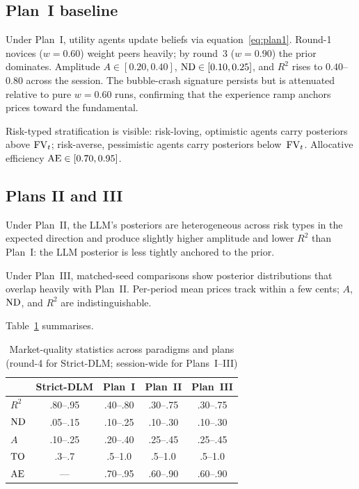 \subsection{Plan~I baseline}

Under Plan~I, utility agents update beliefs via
equation~\eqref{eq:plan1}.  Round-1 novices ($w{=}0.60$) weight peers
heavily; by round~3 ($w{=}0.90$) the prior dominates.  Amplitude
$A\in[0.20,0.40]$, $\mathrm{ND}\in[0.10,0.25]$, and $R^2$ rises to
$0.40$--$0.80$ across the session.  The bubble-crash signature
persists but is attenuated relative to pure $w{=}0.60$ runs,
confirming that the experience ramp anchors prices toward the
fundamental.

Risk-typed stratification is visible: risk-loving, optimistic agents
carry posteriors above $\mathrm{FV}_t$; risk-averse, pessimistic agents carry
posteriors below~$\mathrm{FV}_t$.  Allocative efficiency
$\mathrm{AE}\in[0.70,0.95]$.

\subsection{Plans II and III}

Under Plan~II, the LLM's posteriors are heterogeneous across risk
types in the expected direction and produce slightly higher amplitude
and lower $R^2$ than Plan~I: the LLM posterior is less tightly
anchored to the prior.

Under Plan~III, matched-seed comparisons show posterior distributions
that overlap heavily with Plan~II.  Per-period mean prices track
within a few cents; $A$, $\mathrm{ND}$, and $R^2$ are indistinguishable.

Table~\ref{tab:mktq} summarises.

\begin{table}[h]
\centering\small
\caption{Market-quality statistics across paradigms and plans
(round-4 for Strict-DLM; session-wide for Plans~I--III)}
\label{tab:mktq}
\begin{tabular}{l cccc}
\toprule
& Strict-DLM & Plan~I & Plan~II & Plan~III \\
\midrule
$R^2$       & .80--.95 & .40--.80 & .30--.75 & .30--.75 \\
$\mathrm{ND}$       & .05--.15 & .10--.25 & .10--.30 & .10--.30 \\
$A$         & .10--.25 & .20--.40 & .25--.45 & .25--.45 \\
$\mathrm{TO}$       & .3--.7   & .5--1.0  & .5--1.0  & .5--1.0  \\
$\mathrm{AE}$ & ---      & .70--.95 & .60--.90 & .60--.90 \\
\bottomrule
\end{tabular}
\end{table}

